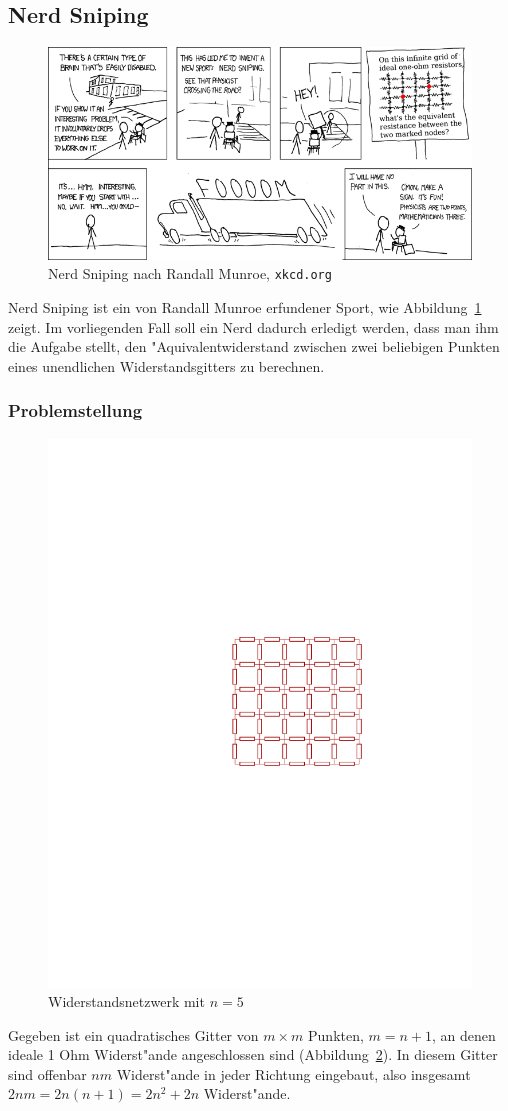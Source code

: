 \subsection{Nerd Sniping}
\begin{figure}
\begin{center}
\includegraphics[width=\hsize]{graphics/nerdsniping}
\end{center}
\caption{Nerd Sniping nach Randall Munroe, {\tt xkcd.org}\label{nerdsniping}}
\end{figure}
Nerd Sniping ist ein von Randall Munroe erfundener Sport, wie
Abbildung~\ref{nerdsniping} zeigt. Im vorliegenden Fall soll
ein Nerd dadurch erledigt werden, dass man ihm die Aufgabe
stellt, den "Aquivalentwiderstand zwischen zwei beliebigen
Punkten eines unendlichen Widerstandsgitters zu berechnen.

\subsubsection{Problemstellung}
\begin{figure}
\begin{center}
\includegraphics[width=0.6\hsize]{graphics/grid}
\end{center}
\caption{Widerstandsnetzwerk mit $n=5$\label{grid}}
\end{figure}
Gegeben ist ein quadratisches Gitter von $m\times m$ Punkten,
$m = n+1$, an denen ideale 1 Ohm Widerst"ande angeschlossen sind
(Abbildung~\ref{grid}).
In diesem Gitter sind offenbar $nm$ Widerst"ande in jeder Richtung
eingebaut, also insgesamt $2nm=2n(n+1)=2n^2+2n$ Widerst"ande.

